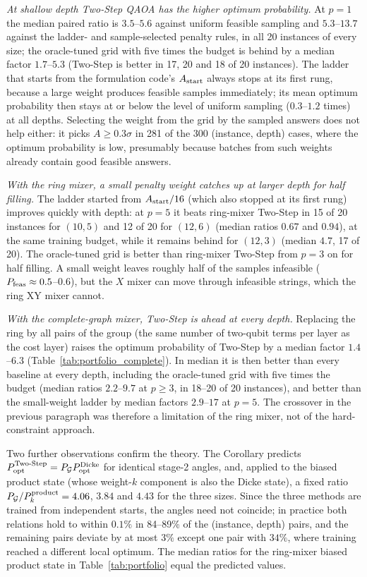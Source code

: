 \emph{At shallow depth Two-Step QAOA has the higher optimum probability.} At $p=1$ the median paired ratio is $3.5$--$5.6$ against uniform feasible sampling and $5.3$--$13.7$ against the ladder- and sample-selected penalty rules, in all 20 instances of every size; the oracle-tuned grid with five times the budget is behind by a median factor $1.7$--$5.3$ (Two-Step is better in 17, 20 and 18 of 20 instances).
The ladder that starts from the formulation code's $A_{\rm start}$ always stops at its first rung, because a large weight produces feasible samples immediately; its mean optimum probability then stays at or below the level of uniform sampling ($0.3$--$1.2$ times) at all depths. Selecting the weight from the grid by the sampled answers does not help either: it picks $A\ge0.3\sigma$ in 281 of the 300 (instance, depth) cases, where the optimum probability is low, presumably because batches from such weights already contain good feasible answers.

\emph{With the ring mixer, a small penalty weight catches up at larger depth for half filling.} The ladder started from $A_{\rm start}/16$ (which also stopped at its first rung) improves quickly with depth: at $p=5$ it beats ring-mixer Two-Step in 15 of 20 instances for $(10,5)$ and 12 of 20 for $(12,6)$ (median ratios $0.67$ and $0.94$), at the same training budget, while it remains behind for $(12,3)$ (median $4.7$, 17 of 20). The oracle-tuned grid is better than ring-mixer Two-Step from $p=3$ on for half filling. A small weight leaves roughly half of the samples infeasible ($P_{\rm feas}\approx0.5$--$0.6$), but the $X$ mixer can move through infeasible strings, which the ring XY mixer cannot.

\emph{With the complete-graph mixer, Two-Step is ahead at every depth.} Replacing the ring by all pairs of the group (the same number of two-qubit terms per layer as the cost layer) raises the optimum probability of Two-Step by a median factor $1.4$--$6.3$ (Table~\ref{tab:portfolio_complete}). In median it is then better than every baseline at every depth, including the oracle-tuned grid with five times the budget (median ratios $2.2$--$9.7$ at $p\ge3$, in 18--20 of 20 instances), and better than the small-weight ladder by median factors $2.9$--$17$ at $p=5$. The crossover in the previous paragraph was therefore a limitation of the ring mixer, not of the hard-constraint approach.


Two further observations confirm the theory. The Corollary predicts $P_{\rm opt}^{\rm Two\text{-}Step}=P_{\mathcal G}P_{\rm opt}^{\rm Dicke}$ for identical stage-2 angles, and, applied to the biased product state (whose weight-$k$ component is also the Dicke state), a fixed ratio $P_{\mathcal G}/P_k^{\rm product}=4.06$, $3.84$ and $4.43$ for the three sizes. Since the three methods are trained from independent starts, the angles need not coincide; in practice both relations hold to within $0.1\%$ in 84--89\% of the (instance, depth) pairs, and the remaining pairs deviate by at most $3\%$ except one pair with $34\%$, where training reached a different local optimum. The median ratios for the ring-mixer biased product state in Table~\ref{tab:portfolio} equal the predicted values.

